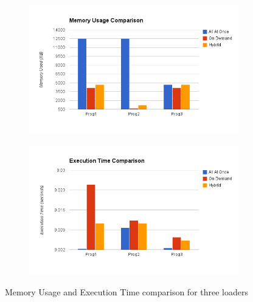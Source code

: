 \documentclass[10pt] {article}
\begin{document}
\begin{figure}[ht!]
\centering
\begin{subfigure}{.5\textwidth}
\centering
\includegraphics[width=\linewidth]{img1.png}
\caption{}
\label{fig:thvsfair1}
\end{subfigure}%
\begin{subfigure}{.5\textwidth}
\centering
\includegraphics[width=\linewidth]{img2.png}
\caption{}
\label{fig:thvsfair2}
\end{subfigure}
\caption{Memory Usage and Execution Time comparison for three loaders}
\label{fig:thvsfair}
\end{figure}
\end{document}
